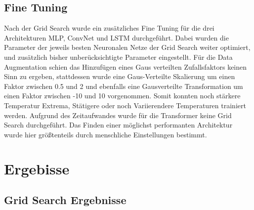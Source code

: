 \documentclass[acmtog, authorversion]{acmart} %
\begin{document}
\subsection{Fine Tuning}
Nach der Grid Search wurde ein zusätzliches Fine Tuning für die drei Architekturen MLP, ConvNet und LSTM durchgeführt. Dabei wurden die Parameter der jeweils besten Neuronalen Netze der Grid Search weiter optimiert, und zusätzlich bisher unberücksichtigte Parameter eingestellt. Für die Data Augmentation schien das Hinzufügen eines Gaus verteilten Zufallsfaktors keinen Sinn zu ergeben, stattdessen wurde eine Gaus-Verteilte Skalierung um einen Faktor zwischen 0.5 und 2 und ebenfalls eine Gausverteilte Transformation um einen Faktor zwischen -10 und 10 vorgenommen. Somit konnten noch stärkere Temperatur Extrema, Stätigere oder noch Variierendere Temperaturen trainiert werden.
Aufgrund des Zeitaufwandes wurde für die Transformer keine Grid Search durchgeführt. Das Finden einer möglichst performanten Architektur wurde hier größtenteils durch menschliche Einstellungen bestimmt.  


\section{Ergebisse}

\subsection{Grid Search Ergebnisse}
\end{document}
